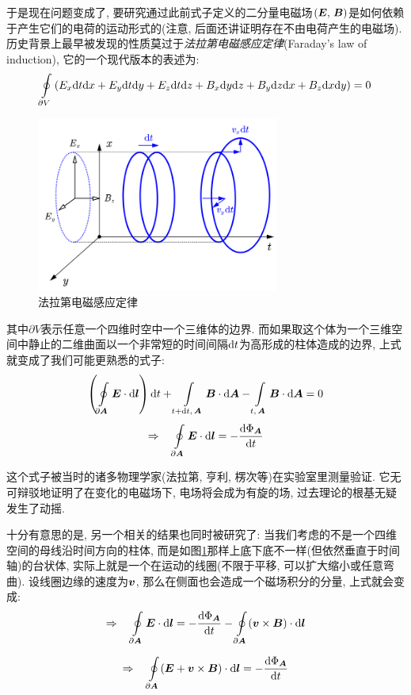 于是现在问题变成了, 要研究通过此前式子定义的二分量电磁场$(\boldsymbol{E},\,\boldsymbol{B})$是如何依赖于产生它们的电荷的运动形式的(注意, 后面还讲证明存在不由电荷产生的电磁场). 历史背景上最早被发现的性质莫过于\emph{法拉第电磁感应定律}(Faraday's law of induction), 它的一个现代版本的表述为:
\[\oint\limits_{\partial V}\left(E_x\textrm{d} t\textrm{d} x+E_y\textrm{d} t\textrm{d} y+E_z\textrm{d} t\textrm{d} z+B_x\textrm{d} y\textrm{d} z+B_y\textrm{d} z\textrm{d} x+B_z\textrm{d} x\textrm{d} y\right)=0\]

\begin{figure}
\vspace{-0.4cm}
\centering
\includegraphics[width=8cm]{image/7-5-1.png}
\caption{法拉第电磁感应定律}\label{fig:7-5-1}
\end{figure}
其中$\partial V$表示任意一个四维时空中一个三维体的边界. 而如果取这个体为一个三维空间中静止的二维曲面以一个非常短的时间间隔$\textrm{d} t$为高形成的柱体造成的边界, 上式就变成了我们可能更熟悉的式子:
\[\left(\oint\limits_{\partial \boldsymbol{A}}\boldsymbol{E}\cdot\textrm{d}\boldsymbol{l}\right)\textrm{d} t+\int\limits_{t+\textrm{d} t,\,\boldsymbol{A}}\boldsymbol{B}\cdot \textrm{d}\boldsymbol{A}-\int\limits_{t,\,\boldsymbol{A}}\boldsymbol{B}\cdot \textrm{d}\boldsymbol{A}=0\]
\[\Rightarrow \quad \oint\limits_{\partial \boldsymbol{A}}\boldsymbol{E}\cdot\textrm{d}\boldsymbol{l}=- \frac{\textrm{d}\Phi_{\boldsymbol{A}}}{\textrm{d} t}\]

这个式子被当时的诸多物理学家(法拉第, 亨利, 楞次等)在实验室里测量验证. 它无可辩驳地证明了在变化的电磁场下, 电场将会成为有旋的场, 过去理论的根基无疑发生了动摇.

十分有意思的是, 另一个相关的结果也同时被研究了: 当我们考虑的不是一个四维空间的母线沿时间方向的柱体, 而是如图\ref{fig:7-5-1}那样上底下底不一样(但依然垂直于时间轴)的台状体, 实际上就是一个在运动的线圈(不限于平移, 可以扩大缩小或任意弯曲). 设线圈边缘的速度为$\boldsymbol{v}$, 那么在侧面也会造成一个磁场积分的分量, 上式就会变成:
\[\Rightarrow \quad \oint\limits_{\partial \boldsymbol{A}}\boldsymbol{E}\cdot\textrm{d}\boldsymbol{l}=- \frac{\textrm{d}\Phi_{\boldsymbol{A}}}{\textrm{d} t}-\oint\limits_{\partial \boldsymbol{A}}(\boldsymbol{v}\times\boldsymbol{B})\cdot\textrm{d}\boldsymbol{l}\]

\[\Rightarrow \quad \oint\limits_{\partial \boldsymbol{A}}(\boldsymbol{E}+\boldsymbol{v}\times\boldsymbol{B})\cdot\textrm{d}\boldsymbol{l}=- \frac{\textrm{d}\Phi_{\boldsymbol{A}}}{\textrm{d} t}\]

